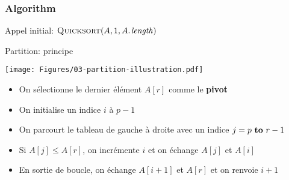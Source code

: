 \begin{frame}\frametitle{ Algorithm}

  \begin{center}



\bigskip

Appel initial: $\proc{Quicksort}(A,1,\attrib{A}{length})$
  \end{center}
\end{frame}

\begin{frame}{Partition: principe}

\centerline{\texttt{[image: Figures/03-partition-illustration.pdf]}}

\bigskip

\begin{itemize}
\item On sélectionne le dernier élément $A[r]$ comme le {\bf pivot}
\item On initialise un indice $i$ à $p-1$
\item On parcourt le tableau de gauche à droite avec un indice $j=p \To r-1$
\item Si $A[j]\le A[r]$, on incrémente $i$ et on échange $A[j]$ et $A[i]$
\item En sortie de boucle, on échange $A[i+1]$ et $A[r]$ et on renvoie $i+1$
\end{itemize}
\end{frame}

